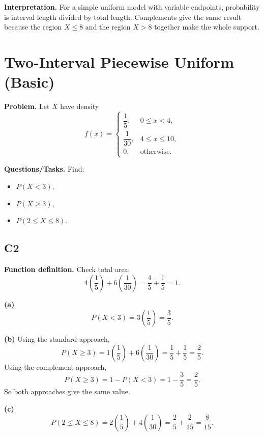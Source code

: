 \textbf{Interpretation.}
For a simple uniform model with variable endpoints, probability is interval length divided by total length. Complements give the same result because the region $X\le 8$ and the region $X>8$ together make the whole support.

\section{Two-Interval Piecewise Uniform (Basic)}

\textbf{Problem.}
Let $X$ have density
\[
f(x)=
\begin{cases}
	\dfrac{1}{5}, & 0\le x<4,\\
	\dfrac{1}{30}, & 4\le x\le 10,\\
	0, & \text{otherwise.}
\end{cases}
\]

\textbf{Questions/Tasks.}
Find:
\begin{itemize}
	\item[(a)] $P(X<3)$,
	\item[(b)] $P(X\ge 3)$,
	\item[(c)] $P(2\le X\le 8)$.
\end{itemize}

\subsection*{C2}

\textbf{Function definition.}
Check total area:
\[
4\left(\frac{1}{5}\right)+6\left(\frac{1}{30}\right)=\frac{4}{5}+\frac{1}{5}=1.
\]


\textbf{(a)}
\[
P(X<3)=3\left(\frac{1}{5}\right)=\frac{3}{5}.
\]


\textbf{(b)} Using the standard approach,
\[
P(X\ge 3)=1\left(\frac{1}{5}\right)+6\left(\frac{1}{30}\right)=\frac{1}{5}+\frac{1}{5}=\frac{2}{5}.
\]
Using the complement approach,
\[
P(X\ge 3)=1-P(X<3)=1-\frac{3}{5}=\frac{2}{5}.
\]
So both approaches give the same value.


\textbf{(c)}
\[
P(2\le X\le 8)=2\left(\frac{1}{5}\right)+4\left(\frac{1}{30}\right)=\frac{2}{5}+\frac{2}{15}=\frac{8}{15}.
\]


